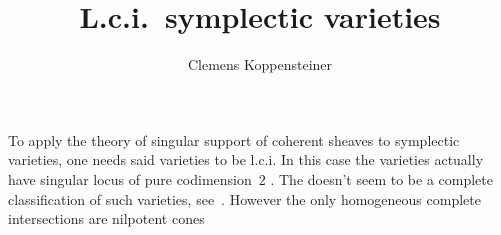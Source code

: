 \documentclass[english,no-theorem-numbers]{short-notes}
\title{L.c.i.~symplectic varieties}
\author{Clemens Koppensteiner}
\begin{document}
\maketitle

To apply the theory of singular support of coherent sheaves to symplectic varieties, one needs said varieties to be l.c.i.
In this case the varieties actually have singular locus of pure codimension~$2$ \cite[Corollary~1.5]{Fu:2006:SurveySymplectic}.
The doesn't seem to be a complete classification of such varieties, see~\cite[Problem~1]{Fu:2006:SurveySymplectic}.
However the only homogeneous complete intersections are nilpotent cones \cite{Namikawa:2013:HomogeneousSmplecticVarietiesOfCompleteIntersection}

\printbibliography
\end{document}
